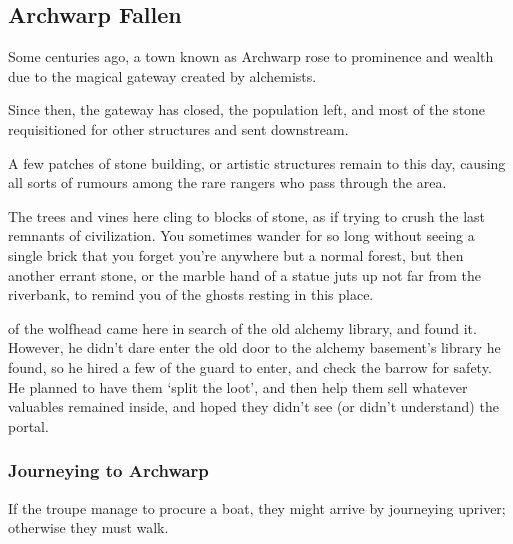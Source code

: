 
\subsection{Archwarp Fallen}
\label{lostcity}

\begin{exampletext}
  Some centuries ago, a town known as Archwarp rose to prominence and wealth due to the magical gateway created by alchemists.

  Since then, the gateway has closed, the population left, and most of the stone requisitioned for other structures and sent downstream.

  A few patches of stone building, or artistic structures remain to this day, causing all sorts of rumours among the rare rangers who pass through the area.
\end{exampletext}

\begin{boxtext}
  The trees and vines here cling to blocks of stone, as if trying to crush the last remnants of civilization.
  You sometimes wander for so long without seeing a single brick that you forget you're anywhere but a normal forest, but then another errant stone, or the marble hand of a statue juts up not far from the riverbank, to remind you of the ghosts resting in this place.
\end{boxtext}

\begin{exampletext}
  \noindent
   of the \gls{wolfhead} came here in search of the old alchemy library, and found it.
  However, he didn't dare enter the old door to the alchemy basement's library he found, so he hired a few of the \gls{guard} to enter, and check the barrow for safety.
  He planned to have them `split the loot', and then help them sell whatever valuables remained inside, and hoped they didn't see (or didn't understand) the portal.
\end{exampletext}

\subsubsection*{Journeying to Archwarp}
If the troupe manage to procure a boat, they might arrive by journeying upriver; otherwise they must walk.

